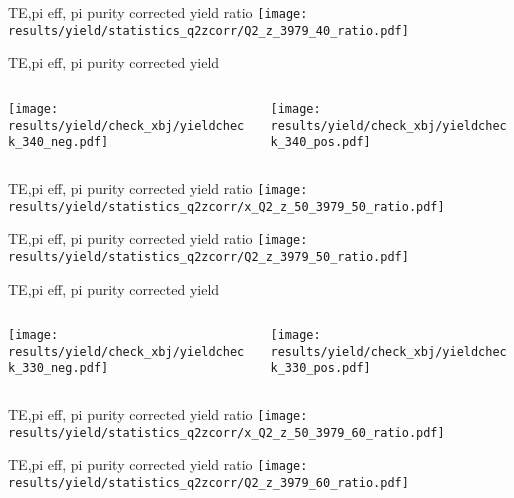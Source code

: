 \begin{frame}{TE,pi eff, pi purity corrected yield ratio}
\texttt{[image: results/yield/statistics\_q2zcorr/Q2\_z\_3979\_40\_ratio.pdf]}
\end{frame}
\begin{frame}{TE,pi eff, pi purity corrected yield}
\begin{columns}
\begin{column}[T]{0.5\textwidth}
\texttt{[image: results/yield/check\_xbj/yieldcheck\_340\_neg.pdf]}
\end{column}
\begin{column}[T]{0.5\textwidth}
\texttt{[image: results/yield/check\_xbj/yieldcheck\_340\_pos.pdf]}
\end{column}
\end{columns}
\end{frame}
\begin{frame}{TE,pi eff, pi purity corrected yield ratio}
\texttt{[image: results/yield/statistics\_q2zcorr/x\_Q2\_z\_50\_3979\_50\_ratio.pdf]}
\end{frame}
\begin{frame}{TE,pi eff, pi purity corrected yield ratio}
\texttt{[image: results/yield/statistics\_q2zcorr/Q2\_z\_3979\_50\_ratio.pdf]}
\end{frame}
\begin{frame}{TE,pi eff, pi purity corrected yield}
\begin{columns}
\begin{column}[T]{0.5\textwidth}
\texttt{[image: results/yield/check\_xbj/yieldcheck\_330\_neg.pdf]}
\end{column}
\begin{column}[T]{0.5\textwidth}
\texttt{[image: results/yield/check\_xbj/yieldcheck\_330\_pos.pdf]}
\end{column}
\end{columns}
\end{frame}
\begin{frame}{TE,pi eff, pi purity corrected yield ratio}
\texttt{[image: results/yield/statistics\_q2zcorr/x\_Q2\_z\_50\_3979\_60\_ratio.pdf]}
\end{frame}
\begin{frame}{TE,pi eff, pi purity corrected yield ratio}
\texttt{[image: results/yield/statistics\_q2zcorr/Q2\_z\_3979\_60\_ratio.pdf]}
\end{frame}
